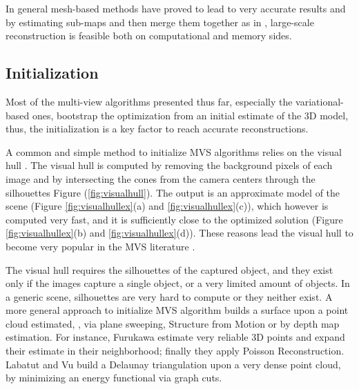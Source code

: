 In general mesh-based methods have proved to lead to very accurate results and  by estimating  sub-maps and then merge them together as in \cite{vu2011large},  large-scale reconstruction is feasible both on computational and memory sides.


\subsection{Initialization}
Most of the  multi-view algorithms presented thus far, especially the variational-based ones, bootstrap the optimization from an initial estimate of the 3D model, thus, the initialization is a key factor to reach accurate reconstructions.

A common and simple method to initialize MVS algorithms relies on the visual hull \cite{laurentini1994visual}. 
The visual hull is computed by removing the background pixels of each image and by intersecting the cones from the camera centers through the silhouettes Figure (\ref{fig:visualhull}). 
The output is an approximate model of the scene (Figure \ref{fig:visualhullex}(a) and \ref{fig:visualhullex}(c)), which however is computed very fast, and it is sufficiently close to the optimized solution (Figure \ref{fig:visualhullex}(b) and \ref{fig:visualhullex}(d)). These reasons lead the visual hull to become very popular in the MVS literature \cite{jin2002variational,soatto2003tales,zaharescu2007transformesh,yoon2010joint}.

The visual hull requires the silhouettes of the captured object, and they exist only if the images capture a single object, or a very limited amount of objects.
In a generic scene, silhouettes are very hard to compute or they neither exist.
A more general approach to initialize MVS algorithm builds a surface upon a point cloud estimated, \eg, via plane sweeping, Structure from Motion or by depth map estimation.
For instance, Furukawa \etal \cite{fu10} estimate very reliable 3D points and expand their estimate in their neighborhood; finally they apply Poisson Reconstruction. 
Labatut \etal \cite{labatut2007efficient} and Vu \etal \cite{vu_et_al_2012} build a Delaunay triangulation upon a very dense point cloud, by minimizing an energy functional via graph cuts.


